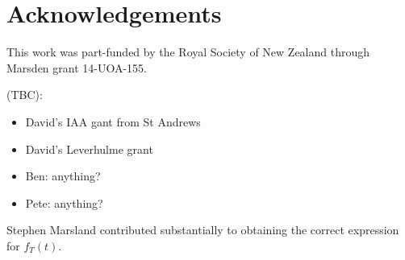 \documentclass[useAMS, usenatbib, referee]{biom}\usepackage[]{graphicx}\usepackage[]{color}
\begin{document}


\section*{Acknowledgements}
This work was part-funded by the Royal Society of New Zealand through Marsden grant 14-UOA-155.

(TBC):
\begin{itemize}
\item David's IAA gant from St Andrews
\item David's Leverhulme grant
\item Ben: anything?
\item Pete: anything?
\end{itemize}
Stephen Marsland contributed substantially to obtaining the correct expression for $f_T(t)$.




\end{document}
